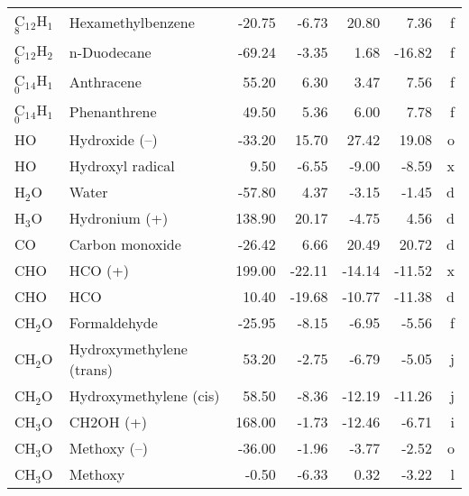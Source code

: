 \begin{table}
\begin{center}
\begin{tabular}{llrrrrr}
 C$_1$$_2$H$_1$$_8$      & Hexamethylbenzene               &   -20.75    &    -6.73  &    20.80  &     7.36  &      f\\
 C$_1$$_2$H$_2$$_6$      & n-Duodecane                     &   -69.24    &    -3.35  &     1.68  &   -16.82  &      f\\
 C$_1$$_4$H$_1$$_0$      & Anthracene                      &    55.20    &     6.30  &     3.47  &     7.56  &      f\\
 C$_1$$_4$H$_1$$_0$      & Phenanthrene                    &    49.50    &     5.36  &     6.00  &     7.78  &      f\\
 HO          & Hydroxide (--)                   &   -33.20    &    15.70  &    27.42  &    19.08  &      o\\
 HO          & Hydroxyl radical                &     9.50    &    -6.55  &    -9.00  &    -8.59  &      x\\
 H$_2$O         & Water                           &   -57.80    &     4.37  &    -3.15  &    -1.45  &      d\\
 H$_3$O         & Hydronium (+)                   &   138.90    &    20.17  &    -4.75  &     4.56  &      d\\
 CO          & Carbon monoxide                 &   -26.42    &     6.66  &    20.49  &    20.72  &      d\\
 CHO         & HCO (+)                         &   199.00    &   -22.11  &   -14.14  &   -11.52  &      x\\
 CHO         & HCO                             &    10.40    &   -19.68  &   -10.77  &   -11.38  &      d\\
 CH$_2$O        & Formaldehyde                    &   -25.95    &    -8.15  &    -6.95  &    -5.56  &      f\\
 CH$_2$O        & Hydroxymethylene (trans)        &    53.20    &    -2.75  &    -6.79  &    -5.05  &      j\\
 CH$_2$O        & Hydroxymethylene (cis)          &    58.50    &    -8.36  &   -12.19  &   -11.26  &      j\\
 CH$_3$O        & CH2OH (+)                       &   168.00    &    -1.73  &   -12.46  &    -6.71  &      i\\
 CH$_3$O        & Methoxy (--)                     &   -36.00    &    -1.96  &    -3.77  &    -2.52  &      o\\
 CH$_3$O        & Methoxy                         &    -0.50    &    -6.33  &     0.32  &    -3.22  &      l\\
\hline
\end{tabular}
\end{center}
\end{table}
\clearpage

